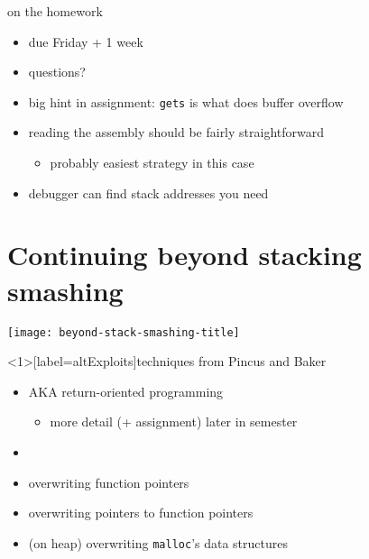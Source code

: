 \begin{frame}
    \titlepage
\end{frame}



\begin{frame}{on the homework}
    \begin{itemize}
        \item due Friday + 1 week
        \item questions?
        \vspace{.5cm}
        \item big hint in assignment: {\tt gets} is what does buffer overflow
        \item reading the assembly should be fairly straightforward
            \begin{itemize}
            \item probably easiest strategy in this case
            \end{itemize}
        \item debugger can find stack addresses you need
    \end{itemize}
\end{frame}

\section{Continuing beyond stacking smashing}

\begin{frame}{}
    \texttt{[image: beyond-stack-smashing-title]}
\end{frame}

\begin{frame}<1>[label=altExploits]{techniques from Pincus and Baker}
\begin{itemize}
\item {} AKA return-oriented programming
    \begin{itemize}
    \item more detail (+ assignment) later in semester
    \end{itemize}
\item {}
\item overwriting function pointers
\item overwriting pointers to function pointers
\item (on heap) overwriting {\tt malloc}'s data structures
\end{itemize}
\end{frame}

